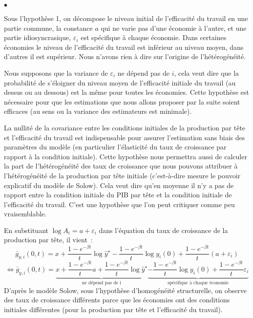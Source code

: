 \documentclass[10pt,notheorems]{beamer}
\theoremstyle{plain}
\theoremstyle{definition} %
\begin{document}
\begin{notes}

  \begin{list}{$\bullet$}{}

  \item Sous l'hypothèse 1, on décompose le niveau initial de l'efficacité du
    travail en une partie commune, la constance $a$ qui ne varie pas d'une
    économie à l'autre, et une partie idiosyncrasique, $\varepsilon_i$ est
    spécifique à chaque économie. Dans certaines économies le niveau de
    l'efficacité du travail est inférieur au niveau moyen, dans d'autres il est
    supérieur. Nous n'avons rien à dire sur l'origine de l'hétérogénéité.\newline

  \item Nous supposons que la variance de $\varepsilon_i$ ne dépend pas de $i$,
    cela veut dire que la probabilité de s'éloigner du niveau moyen de
    l'efficacité initiale du travail (au dessus ou au dessous) est la même pour
    toutes les économies. Cette hypothèse est nécessaire pour que les
    estimations que nous allons proposer par la suite soient efficaces (au sens ou
    la variance des estimateurs est minimale).\newline

  \item La nullité de la covariance entre les conditions initiales de la
    production par tête et l'efficacité du travail est indispensable pour
    assurer l'estimation sans biais des paramètres du modèle (en particulier
    l'élasticité du taux de croissance par rapport à la condition initiale).
    Cette hypothèse nous permettra aussi de calculer la part de l'hétérogénéité
    des taux de croissance que nous pouvons attribuer à l'hétérogénéité de la
    production par tête initiale (c'est-à-dire mesure le pouvoir explicatif du
    modèle de Solow). Cela veut dire qu'en moyenne il n'y a pas de rapport entre
    la condition initiale du PIB par tête et la condition initiale de
    l'efficacité du travail. C'est une hypothèse que l'on peut critiquer comme
    peu vraisemblable.\newline

  \item En substituant $\log A_i = a + \varepsilon_i$ dans l'équation du taux de
    croissance de la production par tête, il vient~:
    \[
      \bar g_{y,i}(0,t) = x + \frac{1-e^{-\beta t}}{t}\log \hat y^{\star} - \frac{1-e^{-\beta t}}{t}\log y_i(0) + \frac{1-e^{-\beta t}}{t}\left(a + \varepsilon_i\right)
    \]
    \[
      \Leftrightarrow \bar g_{y,i}(0,t) = \underbrace{x + \frac{1-e^{-\beta t}}{t} a + \frac{1-e^{-\beta t}}{t}\log \hat y^{\star}}_{\text{ne dépend pas de i}} \underbrace{- \frac{1-e^{-\beta t}}{t}\log y_i(0) + \frac{1-e^{-\beta t}}{t}\varepsilon_i}_{\text{spécifique à chaque économie}}
    \]
    D'après le modèle Solow, sous l'hypothèse d'homogénéité structurelle, on
    observe des taux de croissance différents parce que les économies ont des
    conditions initiales différentes (pour la production par tête et
    l'efficacité du travail).\newline


\end{list}
\end{notes}
\end{document}
